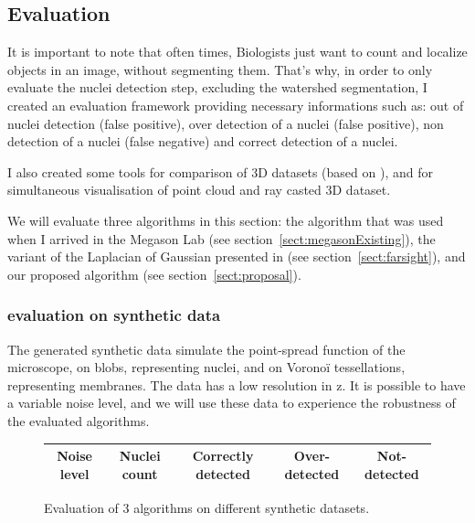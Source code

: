 \subsection{Evaluation}

It is important to note that often times, Biologists just want to count and localize objects in an image, without segmenting them.
That's why, in order to only evaluate the nuclei detection step, excluding the watershed segmentation, I created an evaluation framework providing necessary informations such as:
 out of nuclei detection (false positive), over detection of a nuclei (false positive), non detection of a nuclei (false negative) and correct detection of a nuclei.

I also created some tools for comparison of 3D datasets (based on {\gofigure}), and for simultaneous visualisation of point cloud and ray casted 3D dataset.

We will evaluate three algorithms in this section:
the algorithm that was used when I arrived in the Megason Lab (see section~\ref{sect:megasonExisting}),
the variant of the Laplacian of Gaussian presented in \cite{al2009improved} (see section~\ref{sect:farsight}),
and our proposed algorithm (see section~\ref{sect:proposal}).


\subsubsection{evaluation on synthetic data}

The generated synthetic data simulate the point-spread function of the microscope, on blobs, representing nuclei, and on Voronoï tessellations, representing membranes.
The data has a low resolution in z.
It is possible to have a variable noise level, and we will use these data to experience the robustness of the evaluated algorithms.

\begin{figure}[htb]
\begin{center}
\begin{tabular}{|c|c|c|c|c|}
\hline Noise level & Nuclei count & Correctly detected & Over-detected & Not-detected \\ 
\hline
\end{tabular} 
\end{center}
\caption{Evaluation of 3 algorithms on different synthetic datasets.}
\label{tab:DataSizes}
\end{figure}


